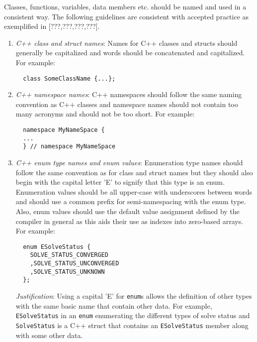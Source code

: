 Classes, functions, variables, data members etc. should be named and used in a
consistent way.  The following guidelines are consistent with accepted
practice as exemplified in [???,???,???,???].

\begin{enumerate}

{}\item\textit{C++ class and struct names}: Names for C++ classes and structs
should generally be capitalized and words should be concatenated and
capitalized.  For example:

{\small\begin{verbatim}
  class SomeClassName {...};
\end{verbatim}}

{}\item\textit{C++ namespace names}: C++ namespaces should follow the same
naming convention as C++ classes and namespace names should not contain too
many acronyms and should not be too short.  For example:

{\small\begin{verbatim}
  namespace MyNameSpace {
  ...
  } // namespace MyNameSpace 
\end{verbatim}}

{}\item\textit{C++ enum type names and enum values}: Enumeration type names
should follow the same convention as for class and struct names but they
should also begin with the capital letter 'E' to signify that this type is an
enum.  Enumeration values should be all upper-case with underscores between
words and should use a common prefix for semi-namespacing with the enum type.
Also, enum values should use the default value assignment defined by the
compiler in general as this aids their use as indexes into zero-based arrays.
For example:

{\small\begin{verbatim}
  enum ESolveStatus {
    SOLVE_STATUS_CONVERGED
    ,SOLVE_STATUS_UNCONVERGED
    ,SOLVE_STATUS_UNKNOWN
  };
\end{verbatim}}

{}\textit{Justification}: Using a capital 'E' for {}\texttt{enum}s allows the
definition of other types with the same basic name that contain other data.
For example, {}\texttt{ESolveStatus} in an {}\texttt{enum} enumerating the
different types of solve status and {}\texttt{SolveStatus} is a C++ struct
that contains an {}\texttt{ESolveStatus} member along with some other data.


\end{enumerate}

